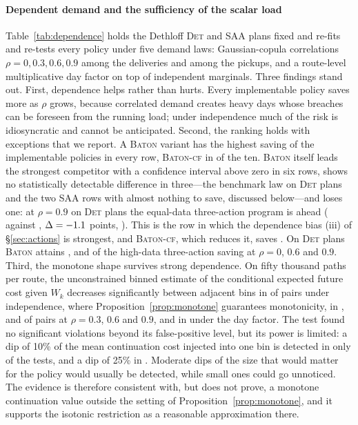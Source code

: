 \documentclass[preprint,authoryear,12pt]{elsarticle}
\theoremstyle{definition}
\theoremstyle{remark}
\begin{document}
\paragraph{Dependent demand and the sufficiency of the scalar load}
Table~\ref{tab:dependence} holds the Dethloff \textsc{Det} and
\textsc{SAA} plans fixed and re-fits and re-tests every policy under
five demand laws: Gaussian-copula correlations $\rho = 0, 0.3, 0.6, 0.9$
among the deliveries and among the pickups, and a route-level
multiplicative day factor on top of independent marginals. Three
findings stand out. First, dependence helps rather than hurts. Every
implementable policy saves more as $\rho$ grows, because correlated demand creates
heavy days whose breaches can be foreseen from the running load; under
independence much of the risk is idiosyncratic and cannot be
anticipated. Second, the ranking holds with exceptions that we report.
A \textsc{Baton} variant has the highest saving of the implementable
policies in every row, \textsc{Baton-cf} in \depCfAbove{} of the ten.
\textsc{Baton} itself leads the strongest competitor with a
confidence interval above zero in six rows, shows no statistically
detectable difference in three---the
benchmark law on \textsc{Det} plans and the two \textsc{SAA} rows with
almost nothing to save, discussed below---and loses one: at $\rho = 0.9$
on \textsc{Det} plans the equal-data three-action program is ahead
(\depRhoNineDetCompSv{} against \depRhoNineDetBaton, $\Delta =
-1.1$ points, \depRhoNineDetDeltaCI). This is the row in
which the dependence bias (iii) of \S\ref{sec:actions} is strongest,
and \textsc{Baton-cf}, which reduces it, saves \depRhoNineDetCf. On
\textsc{Det} plans \textsc{Baton} attains \depRhoZeroDetRatio,
\depRhoSixDetRatio{} and \depRhoNineDetRatio{} of the high-data
three-action saving at $\rho = 0$, $0.6$ and $0.9$. Third, the monotone
shape survives strong dependence. On fifty thousand paths per route, the
unconstrained binned estimate of the conditional expected future cost
given $W_k$ decreases significantly between adjacent bins in
\shapeViolZero{} of pairs under independence, where
Proposition~\ref{prop:monotone} guarantees monotonicity, in
\shapeViolThree, \shapeViolSix{} and \shapeViolNine{} of pairs at $\rho =
0.3$, $0.6$ and $0.9$, and in \shapeViolDayfac{} under the day factor.
The test found no significant violations beyond its false-positive
level, but its power is limited: a dip of 10\% of the mean continuation
cost injected into one bin is detected in only \shapePowTenAll{} of the
tests, and a dip of 25\% in \shapePowTwentyFiveAll. Moderate dips of
the size that would matter for the policy would usually be detected,
while small ones could go unnoticed. The evidence is therefore
consistent with, but does not prove, a monotone continuation value
outside the setting of Proposition~\ref{prop:monotone}, and it supports
the isotonic restriction as a reasonable approximation there.
\end{document}
